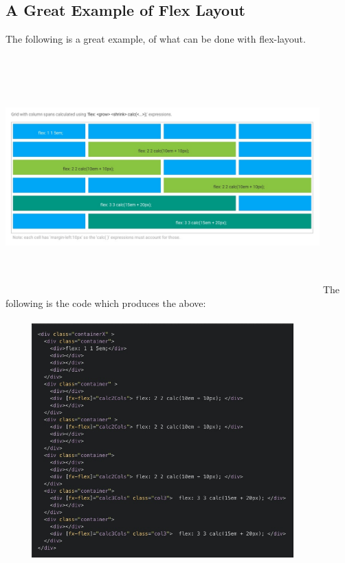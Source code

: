 \subsection{ A Great Example of Flex Layout }

The following is a great example, of what can be done with flex-layout.
\\
\\
\includegraphics[width=12.1cm, height=9cm]{responsive/flex-layout/flex-layout-grid}
The following is the code which produces the above:
\\
\\
\includegraphics[width=12.1cm, height=9cm]{responsive/flex-layout/flex-layout-code}
